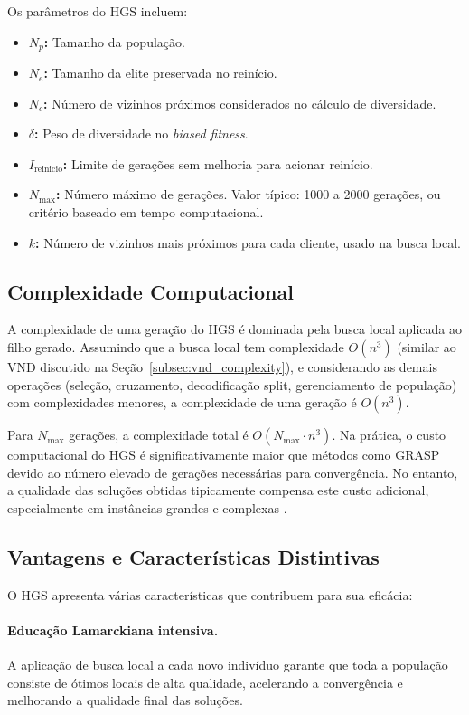 Os parâmetros do HGS incluem:
\begin{itemize}
    \item \textbf{$N_p$:} Tamanho da população. 
    \item \textbf{$N_e$:} Tamanho da elite preservada no reinício.
    \item \textbf{$N_c$:} Número de vizinhos próximos considerados no cálculo de diversidade.
    \item \textbf{$\delta$:} Peso de diversidade no \emph{biased fitness}.
    \item \textbf{$I_{\text{reinicio}}$:} Limite de gerações sem melhoria para acionar reinício.
    \item \textbf{$N_{\max}$:} Número máximo de gerações. Valor típico: 1000 a 2000 gerações, ou critério baseado em tempo computacional.
    \item \textbf{$k$:} Número de vizinhos mais próximos para cada cliente, usado na busca local.
\end{itemize}

\subsection{Complexidade Computacional}

A complexidade de uma geração do HGS é dominada pela busca local aplicada ao filho gerado. Assumindo que a busca local tem complexidade $O(n^3)$ (similar ao VND discutido na Seção~\ref{subsec:vnd_complexity}), e considerando as demais operações (seleção, cruzamento, decodificação split, gerenciamento de população) com complexidades menores, a complexidade de uma geração é $O(n^3)$.

Para $N_{\max}$ gerações, a complexidade total é $O(N_{\max} \cdot n^3)$. Na prática, o custo computacional do HGS é significativamente maior que métodos como GRASP devido ao número elevado de gerações necessárias para convergência. No entanto, a qualidade das soluções obtidas tipicamente compensa este custo adicional, especialmente em instâncias grandes e complexas \cite{vidal2013}.

\subsection{Vantagens e Características Distintivas}

O HGS apresenta várias características que contribuem para sua eficácia:

\paragraph{Educação Lamarckiana intensiva.} A aplicação de busca local a cada novo indivíduo garante que toda a população consiste de ótimos locais de alta qualidade, acelerando a convergência e melhorando a qualidade final das soluções.

